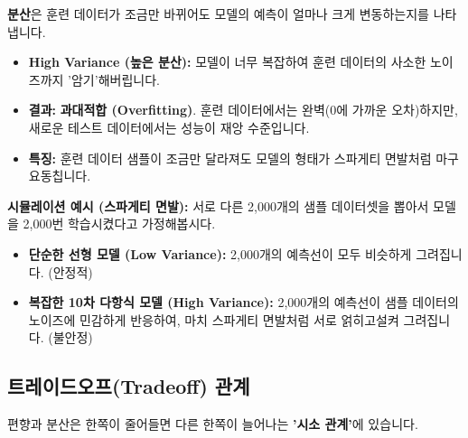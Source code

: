 \documentclass[11pt,a4paper]{book}
\theoremstyle{definition}
\begin{document}
\begin{tcolorbox}[title={분산 (Variance): 탄착군이 흩어지다 (비일관성)}]
\textbf{분산}은 훈련 데이터가 조금만 바뀌어도 모델의 예측이 얼마나 크게 변동하는지를 나타냅니다.

\begin{itemize}
    \item \textbf{High Variance (높은 분산):} 모델이 너무 복잡하여 훈련 데이터의 사소한 노이즈까지 '암기'해버립니다.
    \item \textbf{결과:} \textbf{과대적합 (Overfitting)}. 훈련 데이터에서는 완벽(0에 가까운 오차)하지만, 새로운 테스트 데이터에서는 성능이 재앙 수준입니다.
    \item \textbf{특징:} 훈련 데이터 샘플이 조금만 달라져도 모델의 형태가 스파게티 면발처럼 마구 요동칩니다.
\end{itemize}
\end{tcolorbox}

\begin{examplebox}
\textbf{시뮬레이션 예시 (스파게티 면발):}
서로 다른 2,000개의 샘플 데이터셋을 뽑아서 모델을 2,000번 학습시켰다고 가정해봅시다.

\begin{itemize}
    \item \textbf{단순한 선형 모델 (Low Variance):} 2,000개의 예측선이 모두 비슷하게 그려집니다. (안정적)
    \item \textbf{복잡한 10차 다항식 모델 (High Variance):} 2,000개의 예측선이 샘플 데이터의 노이즈에 민감하게 반응하여, 마치 스파게티 면발처럼 서로 얽히고설켜 그려집니다. (불안정)
\end{itemize}
\end{examplebox}


\subsection{트레이드오프(Tradeoff) 관계}

편향과 분산은 한쪽이 줄어들면 다른 한쪽이 늘어나는 \textbf{'시소 관계'}에 있습니다.
\end{document}
